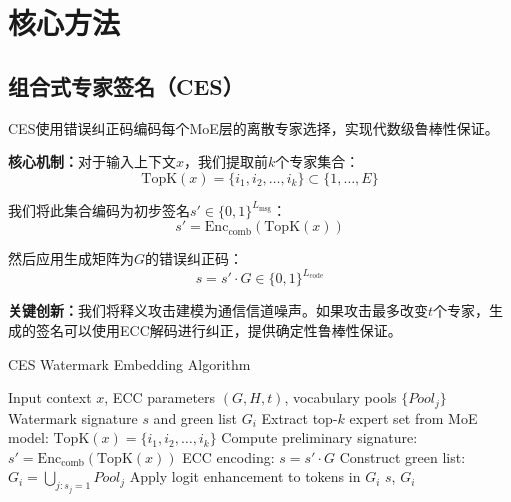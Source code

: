 \documentclass[letterpaper,twocolumn,10pt]{article}
\begin{document}
\section{核心方法}

\subsection{组合式专家签名（CES）}

CES使用错误纠正码编码每个MoE层的离散专家选择，实现代数级鲁棒性保证。

\textbf{核心机制：}对于输入上下文$x$，我们提取前$k$个专家集合：
\begin{equation}
\text{TopK}(x) = \{i_1, i_2, \ldots, i_k\} \subset \{1, \ldots, E\}
\end{equation}

我们将此集合编码为初步签名$s' \in \{0,1\}^{L_{\text{msg}}}$：
\begin{equation}
s' = \text{Enc}_{\text{comb}}(\text{TopK}(x))
\end{equation}

然后应用生成矩阵为$G$的错误纠正码：
\begin{equation}
s = s' \cdot G \in \{0,1\}^{L_{\text{code}}}
\end{equation}

\textbf{关键创新：}我们将释义攻击建模为通信信道噪声。如果攻击最多改变$t$个专家，生成的签名可以使用ECC解码进行纠正，提供确定性鲁棒性保证。

\begin{algorithm}[h]
\caption{CES Watermark Embedding Algorithm}
\begin{algorithmic}[1]
\REQUIRE Input context $x$, ECC parameters $(G, H, t)$, vocabulary pools $\{Pool_j\}$
\ENSURE Watermark signature $s$ and green list $G_i$
\STATE Extract top-$k$ expert set from MoE model: $\text{TopK}(x) = \{i_1, i_2, \ldots, i_k\}$ 
\STATE Compute preliminary signature: $s' = \text{Enc}_{\text{comb}}(\text{TopK}(x))$ 
\STATE ECC encoding: $s = s' \cdot G$ 
\STATE Construct green list: $G_i = \bigcup_{j: s_j=1} Pool_j$ 
\STATE Apply logit enhancement to tokens in $G_i$ 
\RETURN $s$, $G_i$
\end{algorithmic}
\end{algorithm}
\end{document}
